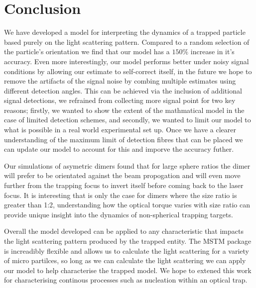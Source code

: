 \documentclass[11pt]{article}
\begin{document}
	\section*{Conclusion}
	We have developed a model for interpreting the dynamics of a trapped particle based purely on the light scattering pattern. Compared to a random selection of the particle's orientation we find that our model has a $150\%$ increase in it's accuracy. Even more interestingly, our model performs better under noisy signal conditions by allowing our estimate to self-correct itself, in the future we hope to remove the artifacts of the signal noise by combing multiple estimates using different detection angles. This can be achieved via the inclusion of additional signal detections, we refrained from collecting more signal point for two key reasons; firstly, we wanted to show the extent of the mathmatical model in the case of limited detection schemes, and secondly, we wanted to limit our model to what is possible in a real world experimental set up. Once we have a clearer understanding of the maximum limit of detection fibres that can be placed we can update our model to account for this and imporve the accuracy futher. 
	
	Our simulations of asymetric dimers found that for large sphere ratios the dimer will prefer to be orientated against the beam propogation and will even move further from the trapping focus to invert itself before coming back to the laser focus. It is interesting that is only the case for dimers where the size ratio is greater than 1:2, understanding how the optical torque varies with size ratio can provide unique insight into the dynamics of non-spherical trapping targets.  
	
	Overall the model developed can be applied to any characteristic that impacts the light scattering pattern produced by the trapped entity. The MSTM package is increadibly flexible and allows us to calculate the light scattering for a variety of micro partilces, so long as we can calculate the light scattering we can apply our model to help characterise the trapped model. We hope to extened this work for characterising continous processes such as nucleation within an optical trap.  
	
	 
	
\end{document}
